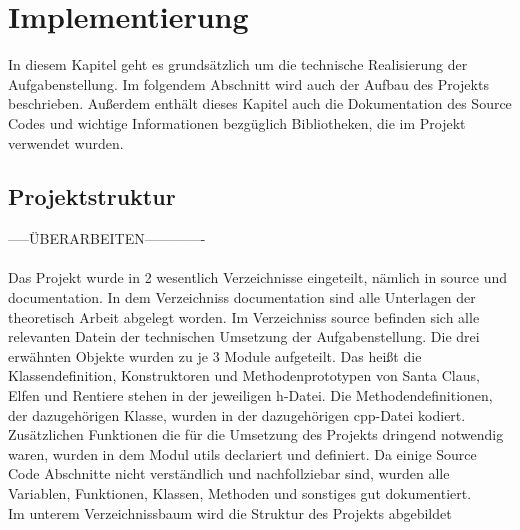 \documentclass[a4paper,12pt]{article}
\begin{document}
\section{Implementierung}
In diesem Kapitel geht es grundsätzlich um die technische Realisierung der
Aufgabenstellung. Im folgendem Abschnitt wird auch der Aufbau des Projekts
beschrieben. Außerdem enthält dieses Kapitel auch die Dokumentation
des Source Codes und wichtige Informationen bezgüglich Bibliotheken, die
im Projekt verwendet wurden.
\subsection{Projektstruktur}
-----ÜBERARBEITEN-------------\\\\
Das Projekt wurde in 2 wesentlich Verzeichnisse eingeteilt, nämlich in source und documentation. In dem Verzeichniss documentation sind alle Unterlagen der theoretisch Arbeit 
abgelegt worden. Im Verzeichniss source befinden sich alle relevanten Datein der technischen Umsetzung der Aufgabenstellung.
Die drei erwähnten Objekte wurden zu je 3 Module aufgeteilt.
Das heißt die Klassendefinition, Konstruktoren und Methodenprototypen von Santa Claus, Elfen und Rentiere stehen in der jeweiligen h-Datei. Die Methodendefinitionen, der dazugehörigen Klasse,
wurden in der dazugehörigen cpp-Datei kodiert. Zusätzlichen Funktionen die für die Umsetzung des Projekts dringend notwendig waren, wurden in dem Modul utils declariert und definiert.
Da einige Source Code Abschnitte nicht verständlich und nachfollziebar sind, wurden alle Variablen, Funktionen, Klassen, Methoden und sonstiges gut dokumentiert.\\
\newpage
Im unterem Verzeichnissbaum wird die Struktur des Projekts abgebildet
\\
\end{document}
